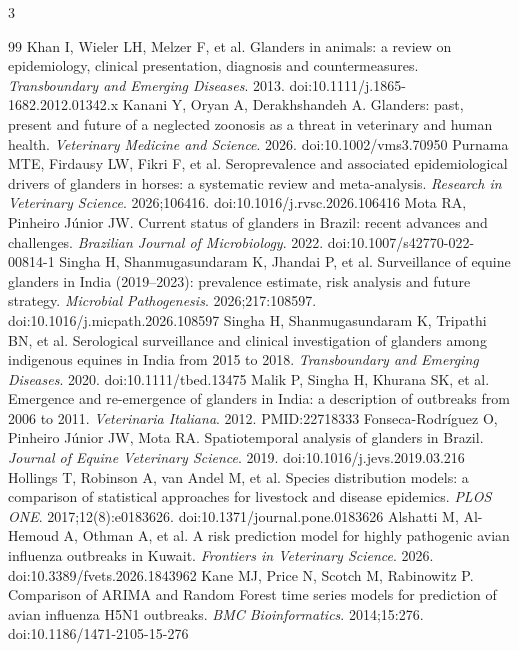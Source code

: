 \documentclass[10pt]{article}
\begin{document}
\begin{multicols}{3}
\begin{thebibliography}{99}
\tiny
\setlength{\itemsep}{0.15em}
\setlength{\parskip}{0pt}
 Khan I, Wieler LH, Melzer F, et al. Glanders in animals: a review on epidemiology, clinical presentation, diagnosis and countermeasures. \emph{Transboundary and Emerging Diseases}. 2013. doi:10.1111/j.1865-1682.2012.01342.x
 Kanani Y, Oryan A, Derakhshandeh A. Glanders: past, present and future of a neglected zoonosis as a threat in veterinary and human health. \emph{Veterinary Medicine and Science}. 2026. doi:10.1002/vms3.70950
 Purnama MTE, Firdausy LW, Fikri F, et al. Seroprevalence and associated epidemiological drivers of glanders in horses: a systematic review and meta-analysis. \emph{Research in Veterinary Science}. 2026;106416. doi:10.1016/j.rvsc.2026.106416
 Mota RA, Pinheiro J\'unior JW. Current status of glanders in Brazil: recent advances and challenges. \emph{Brazilian Journal of Microbiology}. 2022. doi:10.1007/s42770-022-00814-1
 Singha H, Shanmugasundaram K, Jhandai P, et al. Surveillance of equine glanders in India (2019--2023): prevalence estimate, risk analysis and future strategy. \emph{Microbial Pathogenesis}. 2026;217:108597. doi:10.1016/j.micpath.2026.108597
 Singha H, Shanmugasundaram K, Tripathi BN, et al. Serological surveillance and clinical investigation of glanders among indigenous equines in India from 2015 to 2018. \emph{Transboundary and Emerging Diseases}. 2020. doi:10.1111/tbed.13475
 Malik P, Singha H, Khurana SK, et al. Emergence and re-emergence of glanders in India: a description of outbreaks from 2006 to 2011. \emph{Veterinaria Italiana}. 2012. PMID:22718333
 Fonseca-Rodr\'iguez O, Pinheiro J\'unior JW, Mota RA. Spatiotemporal analysis of glanders in Brazil. \emph{Journal of Equine Veterinary Science}. 2019. doi:10.1016/j.jevs.2019.03.216
 Hollings T, Robinson A, van Andel M, et al. Species distribution models: a comparison of statistical approaches for livestock and disease epidemics. \emph{PLOS ONE}. 2017;12(8):e0183626. doi:10.1371/journal.pone.0183626
 Alshatti M, Al-Hemoud A, Othman A, et al. A risk prediction model for highly pathogenic avian influenza outbreaks in Kuwait. \emph{Frontiers in Veterinary Science}. 2026. doi:10.3389/fvets.2026.1843962
 Kane MJ, Price N, Scotch M, Rabinowitz P. Comparison of ARIMA and Random Forest time series models for prediction of avian influenza H5N1 outbreaks. \emph{BMC Bioinformatics}. 2014;15:276. doi:10.1186/1471-2105-15-276

\end{thebibliography}
\end{multicols}
\end{document}
